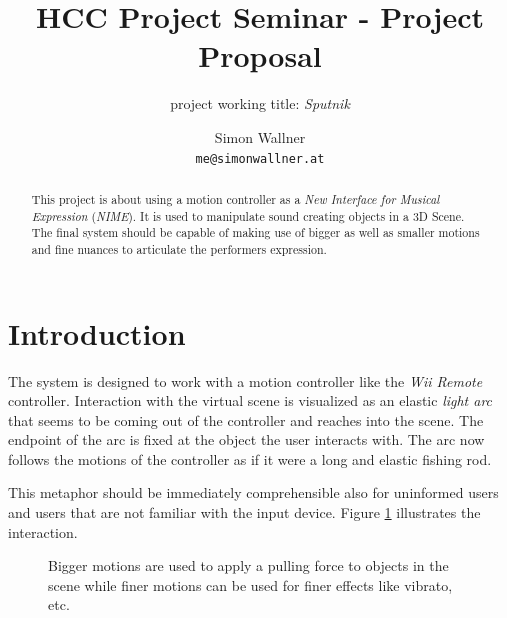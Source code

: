 \documentclass[10pt,a4paper]{scrartcl}
\author{Simon Wallner\\\texttt{me@simonwallner.at}}
\title{HCC Project Seminar - Project Proposal}
\subtitle{project working title: \emph{Sputnik}}
\begin{document}
\maketitle

\begin{abstract}
This project is about using a motion controller as a \emph{New Interface for Musical Expression} (\emph{NIME}). It is used to manipulate sound creating objects in a 3D Scene. The final system should be capable of making use of bigger as well as smaller motions and fine nuances to articulate the performers expression.
\end{abstract}

\section{Introduction}
The system is designed to work with a motion controller like the \emph{Wii Remote} controller. Interaction with the virtual scene is visualized as an elastic \emph{light arc} that seems to be coming out of the controller and reaches into the scene. The endpoint of the arc is fixed at the object the user interacts with. The arc now follows the motions of the controller as if it were a long and elastic fishing rod.

This metaphor should be immediately comprehensible also for uninformed users and users that are not familiar with the input device.  Figure \ref{fig:motion} illustrates the interaction.


\begin{figure}[hbtp]
\centering
{}
\caption{Bigger motions are used to apply a pulling force to objects in the scene while finer motions can be used for finer effects like vibrato, etc.}
\label{fig:motion}
\end{figure}
\end{document}
